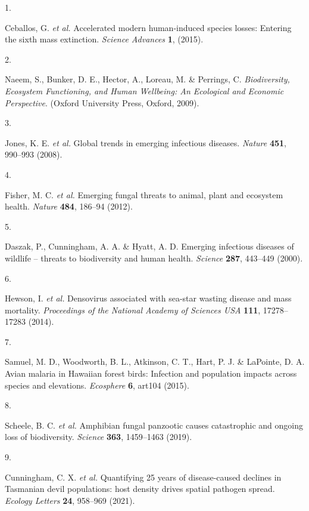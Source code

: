 \documentclass[
  letterpaper,
  DIV=11,
  numbers=noendperiod]{scrartcl}
\newlength{\cslhangindent}
\newlength{\csllabelwidth}
\newenvironment{CSLReferences}[2] %
 {\begin{list}{}{%
  \setlength{\itemindent}{0pt}
  \setlength{\leftmargin}{0pt}
  \setlength{\parsep}{0pt}
  \ifodd #1
   \setlength{\leftmargin}{\cslhangindent}
   \setlength{\itemindent}{-1\cslhangindent}
  \fi
  \setlength{\itemsep}{#2\baselineskip}}}
 {\end{list}}
\newcommand{\CSLLeftMargin}[1]{\parbox[t]{\csllabelwidth}{\strut#1\strut}}
\newcommand{\CSLRightInline}[1]{\parbox[t]{\linewidth - \csllabelwidth}{\strut#1\strut}}
\begin{document}
\label{refs}
\begin{CSLReferences}{0}{0}
\CSLLeftMargin{1. }%
\CSLRightInline{Ceballos, G. \emph{et al.} Accelerated modern
human-induced species losses: Entering the sixth mass extinction.
\emph{Science Advances} \textbf{1}, (2015).}

\CSLLeftMargin{2. }%
\CSLRightInline{Naeem, S., Bunker, D. E., Hector, A., Loreau, M. \&
Perrings, C. \emph{Biodiversity, Ecosystem Functioning, and Human
Wellbeing: An Ecological and Economic Perspective}. (Oxford University
Press, Oxford, 2009).}

\CSLLeftMargin{3. }%
\CSLRightInline{Jones, K. E. \emph{et al.} Global trends in emerging
infectious diseases. \emph{Nature} \textbf{451}, 990--993 (2008).}

\CSLLeftMargin{4. }%
\CSLRightInline{Fisher, M. C. \emph{et al.} Emerging fungal threats to
animal, plant and ecosystem health. \emph{Nature} \textbf{484}, 186--94
(2012).}

\CSLLeftMargin{5. }%
\CSLRightInline{Daszak, P., Cunningham, A. A. \& Hyatt, A. D. Emerging
infectious diseases of wildlife -- threats to biodiversity and human
health. \emph{Science} \textbf{287}, 443--449 (2000).}

\CSLLeftMargin{6. }%
\CSLRightInline{Hewson, I. \emph{et al.} Densovirus associated with
sea-star wasting disease and mass mortality. \emph{Proceedings of the
National Academy of Sciences USA} \textbf{111}, 17278--17283 (2014).}

\CSLLeftMargin{7. }%
\CSLRightInline{Samuel, M. D., Woodworth, B. L., Atkinson, C. T., Hart,
P. J. \& LaPointe, D. A. Avian malaria in {H}awaiian forest birds:
Infection and population impacts across species and elevations.
\emph{Ecosphere} \textbf{6}, art104 (2015).}

\CSLLeftMargin{8. }%
\CSLRightInline{Scheele, B. C. \emph{et al.} Amphibian fungal panzootic
causes catastrophic and ongoing loss of biodiversity. \emph{Science}
\textbf{363}, 1459--1463 (2019).}

\CSLLeftMargin{9. }%
\CSLRightInline{Cunningham, C. X. \emph{et al.} Quantifying 25 years of
disease-caused declines in {T}asmanian devil populations: {h}ost density
drives spatial pathogen spread. \emph{Ecology Letters} \textbf{24},
958--969 (2021).}


\end{CSLReferences}
\end{document}

